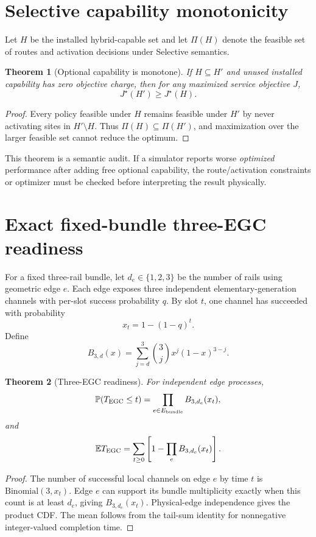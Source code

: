 \documentclass[aps,prx,preprint,superscriptaddress,nofootinbib,longbibliography]{revtex4-2}
\newtheorem{theorem}{Theorem}\newtheorem{proposition}[theorem]{Proposition}\newtheorem{lemma}[theorem]{Lemma}\newtheorem{corollary}[theorem]{Corollary}\newtheorem{definition}[theorem]{Definition}
\newcommand{\E}{\mathbb E}\newcommand{\Prob}{\mathbb P}
\begin{document}
\section{Selective capability monotonicity}
Let $H$ be the installed hybrid-capable set and let $\Pi(H)$ denote the feasible set of routes and activation decisions under Selective semantics.

\begin{theorem}[Optional capability is monotone]
If $H\subseteq H'$ and unused installed capability has zero objective charge, then for any maximized service objective $J$,
\begin{equation}
J^\star(H')\ge J^\star(H).
\end{equation}
\end{theorem}
\begin{proof}
Every policy feasible under $H$ remains feasible under $H'$ by never activating sites in $H'\setminus H$. Thus $\Pi(H)\subseteq\Pi(H')$, and maximization over the larger feasible set cannot reduce the optimum.
\end{proof}
This theorem is a semantic audit. If a simulator reports worse \emph{optimized} performance after adding free optional capability, the route/activation constraints or optimizer must be checked before interpreting the result physically.

\section{Exact fixed-bundle three-EGC readiness}
For a fixed three-rail bundle, let $d_e\in\{1,2,3\}$ be the number of rails using geometric edge $e$. Each edge exposes three independent elementary-generation channels with per-slot success probability $q$. By slot $t$, one channel has succeeded with probability
\begin{equation}
x_t=1-(1-q)^t.
\end{equation}
Define
\begin{equation}
B_{3,d}(x)=\sum_{j=d}^{3}\binom3j x^j(1-x)^{3-j}.
\end{equation}

\begin{theorem}[Three-EGC readiness]
For independent edge processes,
\begin{equation}
\Prob(T_{\rm EGC}\le t)=\prod_{e\in E_{\rm bundle}}B_{3,d_e}(x_t),
\end{equation}
and
\begin{equation}
\E T_{\rm EGC}=\sum_{t\ge0}\left[1-\prod_eB_{3,d_e}(x_t)\right].
\end{equation}
\end{theorem}
\begin{proof}
The number of successful local channels on edge $e$ by time $t$ is $\mathrm{Binomial}(3,x_t)$. Edge $e$ can support its bundle multiplicity exactly when this count is at least $d_e$, giving $B_{3,d_e}(x_t)$. Physical-edge independence gives the product CDF. The mean follows from the tail-sum identity for nonnegative integer-valued completion time.
\end{proof}
\end{document}
